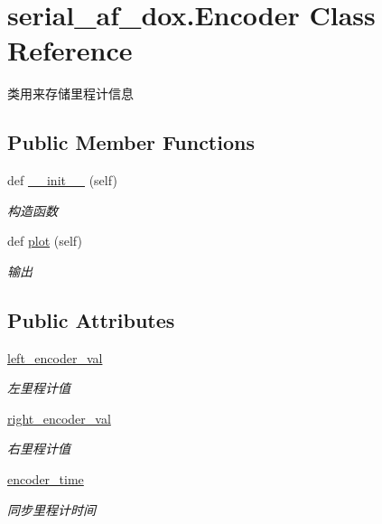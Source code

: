 \hypertarget{classserial__af__dox_1_1_encoder}{}\section{serial\+\_\+af\+\_\+dox.\+Encoder Class Reference}
\label{classserial__af__dox_1_1_encoder}


类用来存储里程计信息  


\subsection*{Public Member Functions}
\begin{DoxyCompactItemize}
\item 
def \hyperlink{classserial__af__dox_1_1_encoder_a57f2b90a574f07724da23ebb31d2d9d0}{\+\_\+\+\_\+init\+\_\+\+\_\+} (self)
\begin{DoxyCompactList}\small\item\em 构造函数 \end{DoxyCompactList}\item 
def \hyperlink{classserial__af__dox_1_1_encoder_ad71ed14354c914c1d649c202df857215}{plot} (self)
\begin{DoxyCompactList}\small\item\em 输出 \end{DoxyCompactList}\end{DoxyCompactItemize}
\subsection*{Public Attributes}
\begin{DoxyCompactItemize}
\item 
\hyperlink{classserial__af__dox_1_1_encoder_a06e3362e0391875aed606f92d35eae51}{left\+\_\+encoder\+\_\+val}
\begin{DoxyCompactList}\small\item\em 左里程计值 \end{DoxyCompactList}\item 
\hyperlink{classserial__af__dox_1_1_encoder_a46d2ec0b9a58e3ee0583d62c5582a49d}{right\+\_\+encoder\+\_\+val}
\begin{DoxyCompactList}\small\item\em 右里程计值 \end{DoxyCompactList}\item 
\hyperlink{classserial__af__dox_1_1_encoder_a46a4f38801448a876bf3f3fa0060d1ba}{encoder\+\_\+time}
\begin{DoxyCompactList}\small\item\em 同步里程计时间 \end{DoxyCompactList}\end{DoxyCompactItemize}


